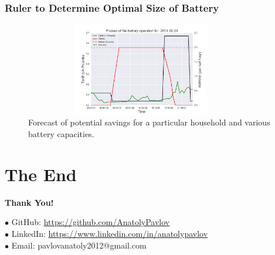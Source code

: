 \documentclass{beamer}
\begin{document}
\begin{frame}
\frametitle{Ruler to Determine Optimal Size of Battery}

\begin{figure}[htb]
\begin{center}
    \includegraphics[height=1.6in, width=0.9\textwidth]{../img/fig4.png}

    \caption{Forecast of potential savings for a particular household and various battery capacities.}

    \label{fig:fig4}
    \end{center}
\end{figure}


\end{frame}


\section{The End}
\begin{frame}

\begin{center}

\textbf{\LARGE Thank You!}\\

\end{center}

$\bullet$ GitHub: \url{https://github.com/AnatolyPavlov}\\

$\bullet$ LinkedIn: \url{https://www.linkedin.com/in/anatolypavlov}\\

$\bullet$ Email: pavlovanatoly2012@gmail.com

\end{frame}
\end{document}
